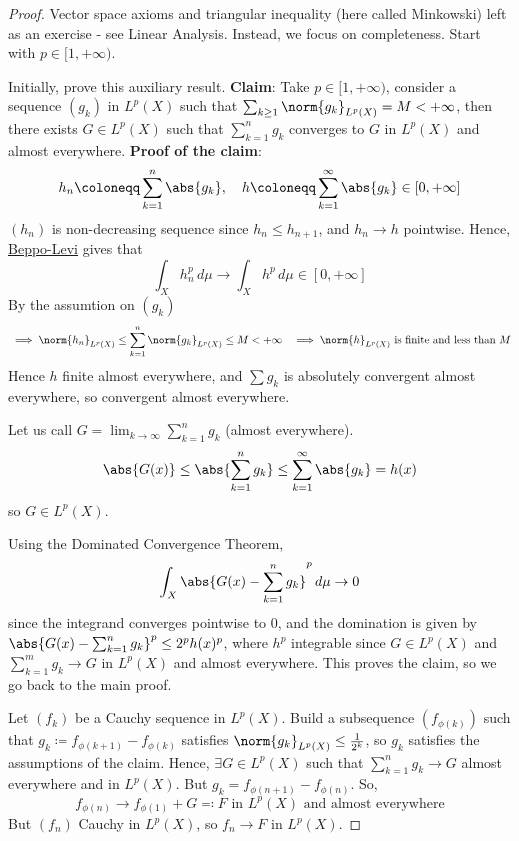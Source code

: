 \documentclass{article}
\begin{document}
\begin{proof}
    Vector space axioms and triangular inequality (here called Minkowski) left as an exercise - see Linear Analysis.
    Instead, we focus on completeness. Start with $p \in [1, +\infty)$.

    Initially, prove this auxiliary result.
    \textbf{Claim}: Take $p \in [1, +\infty)$, consider a sequence $(g_k)$ in $L^p(X)$ such that $\sum_{k \geq 1} \norm{g_k}_{L^p(X)} = M < +\infty$, then there exists $G \in L^p(X)$ such that $\sum_{k=1}^n g_k$ converges to $G$ in $L^p(X)$ and almost everywhere.
    \textbf{Proof of the claim}:
    \begin{equation*}
        h_n \coloneqq \sum_{k=1}^n \abs{g_k}, \quad h \coloneqq \sum_{k=1}^\infty \abs{g_k} \in [0, +\infty]
    \end{equation*}
    $(h_n)$ is non-decreasing sequence since $h_n \leq h_{n+1}$, and $h_n \to h$ pointwise.
    Hence, \hyperlink{thm:Beppo}{Beppo-Levi} gives that
    \begin{equation*}
        \int_X h_n^p \, d\mu \to \int_X h^p  \, d\mu \in [0, +\infty]
    \end{equation*}
    By the assumtion on $(g_k)$
    \begin{align*}
        &\implies \norm{h_n}_{L^p(X)} \leq \sum_{k=1}^n \norm{g_k}_{L^p(X)} \leq M < +\infty
        &\implies \norm{h}_{L^p(X)} \text{ is finite and less than } M
    \end{align*}
    Hence $h$ finite almost everywhere, and $\sum g_k$ is absolutely convergent almost everywhere, so convergent almost everywhere.

    Let us call $G = \lim_{k \to \infty} \sum_{k=1}^n g_k$ (almost everywhere).
    \begin{equation*}
        \abs{G(x)} \leq \abs{\sum_{k=1}^n g_k} \leq \sum_{k=1}^\infty \abs{g_k} = h(x)
    \end{equation*}
    so $G \in L^p(X)$.

    Using the Dominated Convergence Theorem,
    \begin{equation*}
        \int_X \abs{G(x) - \sum_{k=1}^n g_k}^p \, d\mu \to 0
    \end{equation*}
    since the integrand converges pointwise to 0, and the domination is given by $\abs{G(x) - \sum_{k=1}^n g_k}^p \leq 2^p h(x)^p$, where $h^p$ integrable since $G \in L^p(X)$ and $\sum_{k=1}^m g_k \to G$ in $L^p(X)$ and almost everywhere.
    This proves the claim, so we go back to the main proof.

    Let $(f_k)$ be a Cauchy sequence in $L^p(X)$.
    Build a subsequence $(f_{\phi(k)})$ such that $g_k \coloneqq f_{\phi(k+1)} - f_{\phi(k)}$ satisfies $\norm{g_k}_{L^p(X)} \leq \frac{1}{2^k}$, so $g_k$ satisfies the assumptions of the claim.
    Hence, $\exists G \in L^p(X)$ such that $\sum_{k=1}^n g_k \to G$ almost everywhere and in $L^p(X)$. But $g_k = f_{\phi(n+1)} - f_{\phi(n)}$.
    So,
    \begin{equation*}
        f_{\phi(n)} \longrightarrow f_{\phi(1)} + G \eqqcolon F \text{ in } L^p(X) \text{ and almost everywhere}
    \end{equation*}
    But $(f_n)$ Cauchy in $L^p(X)$, so $f_n \to F$ in $L^p(X)$.
\end{proof}
\end{document}
